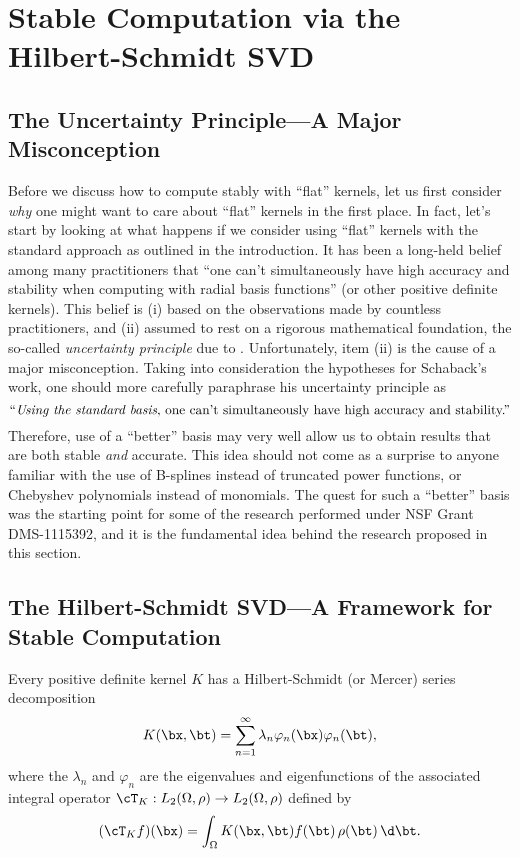 \section{Stable Computation via the Hilbert-Schmidt SVD}\label{SectHSSVD}

\subsection{The Uncertainty Principle---A Major Misconception}\label{SectMisconcept}
Before we discuss how to compute stably with ``flat'' kernels, let us first consider \emph{why} one might want to care about ``flat'' kernels in the first place. In fact, let's start by looking at what happens if we consider using ``flat'' kernels with the standard approach as outlined in the introduction. It has been a long-held belief among many practitioners that ``one can't simultaneously have high accuracy and stability when computing with radial basis functions'' (or other positive definite kernels).
This belief is
(i) based on the observations made by countless practitioners, and
(ii) assumed to rest on a rigorous mathematical foundation, the so-called \emph{uncertainty principle} due to \cite{Schaback95b, Schaback95c}.
Unfortunately, item (ii) is the cause of a major misconception. Taking into consideration the hypotheses for Schaback's work, one should more carefully paraphrase his uncertainty principle as
\[
\text{``\emph{Using the standard basis}, one can't simultaneously have high accuracy and stability.''}
\]
Therefore, use of a ``better'' basis may very well allow us to obtain results that are both stable \emph{and} accurate. This idea should not come as a surprise to anyone familiar with the use of B-splines instead of truncated power functions, or Chebyshev polynomials instead of monomials. The quest for such a ``better'' basis was the starting point for some of the research performed under NSF Grant DMS-1115392, and it is the fundamental idea behind the research proposed in this section.

\subsection{The Hilbert-Schmidt SVD---A Framework for Stable Computation}\label{SectRBFQR}
Every positive definite kernel $K$ has a Hilbert-Schmidt (or Mercer) series decomposition \citep{CourantHilbert53,RasWil06a}
\begin{equation}\label{HSseries}
K(\bx,\bt) = \sum_{n=1}^\infty \lambda_n \varphi_n(\bx) \varphi_n(\bt),
\end{equation}
where the $\lambda_n$ and $\varphi_n$ are the eigenvalues and eigenfunctions of the associated integral operator $\cT_K : L_2(\Omega, \rho) \to L_2(\Omega, \rho)$ defined by
\begin{equation}\label{TK}
(\cT_Kf)(\bx) = \int_\Omega K(\bx, \bt)f(\bt)\, \rho(\bt)\, \d \bt.
\end{equation}

